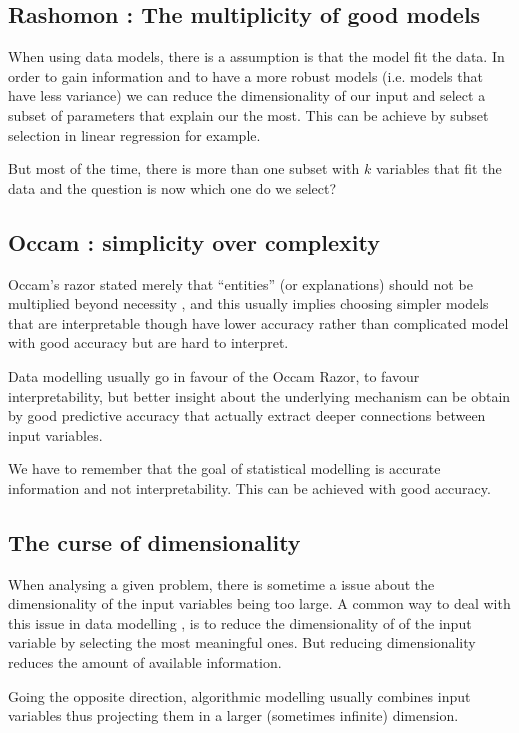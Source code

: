 \documentclass[a4paper,10pt]{article}
\begin{document}
\subsection{Rashomon : The multiplicity of good models}

When using data models, there is a assumption is that the model fit the data. In order to gain information and to have a more robust models (i.e. models that have less variance) we can reduce the dimensionality of our input and select a subset of parameters that explain our the most. This can be achieve by subset selection in linear regression for example.

But most of the time, there is more than one subset with $k$ variables that fit the data and the question is now which one do we select?

\subsection{Occam : simplicity over complexity}

Occam’s razor stated merely that “entities” (or explanations) should not be multiplied beyond necessity \cite{duda} , and this usually implies choosing simpler models that are interpretable though have lower accuracy rather than complicated model with good accuracy but are hard to interpret.

Data modelling usually go in favour of the Occam Razor, to favour interpretability, but better insight about the underlying mechanism can be obtain by good predictive accuracy that actually extract deeper connections between input variables. 

We have to remember that the goal of statistical modelling is accurate information and not interpretability. This can be achieved with good accuracy.

\subsection{The curse of dimensionality}

When analysing a given problem, there is sometime a issue about the dimensionality of the input variables being too large. A common way to deal with this issue in data modelling , is to reduce the dimensionality of of the input variable by selecting the most meaningful ones. But reducing dimensionality reduces the amount of available information.

Going the opposite direction, algorithmic modelling usually combines input variables thus projecting them in a larger (sometimes infinite) dimension.
\end{document}
